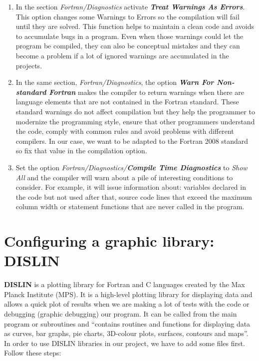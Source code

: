 \begin{enumerate}
    \item In the section \textit{Fortran/Diagnostics} activate \textbf{\textit{Treat Warnings As Errors}}. This option changes some Warnings to Errors so the compilation will fail until they are solved. This function helps to maintain a clean code and avoids to accumulate bugs in a program. Even when those warnings could let the program be compiled, they can also be conceptual mistakes and they can become a problem if a lot of ignored warnings are accumulated in the projects.
    
    \item In the same section, \textit{Fortran/Diagnostics}, the option \textbf{\textit{Warn For Non-standard Fortran}} makes the compiler to return warnings when there are language elements that are not contained in the Fortran standard. These standard warnings do not affect compilation but they help the programmer to modernize the programming style, ensure that other programmers understand the code, comply with common rules and avoid problems with different compilers. In our case, we want to be adapted to the Fortran 2008 standard so fix that value in the compilation option.
    
    \item Set the option \textit{Fortran/Diagnostics/\textbf{Compile Time Diagnostics}} to \textit{Show All} and the compiler will warn about a pile of interesting conditions to consider. For example, it will issue information about: variables declared in the code but not used after that, source code lines that exceed the maximum column width or statement functions that are never called in the program. 

\end{enumerate}




\newpage
\FloatBarrier
    \section{Configuring a graphic library: DISLIN}
    
\textbf{DISLIN} is a plotting library for Fortran and C languages created by the Max Planck Institute (MPS). It is a high-level plotting library for displaying data and allows a quick plot of results when we are making a lot of tests with the code or debugging (graphic debugging) our program. It can be called from the main program or subroutines and ``contains routines and functions for displaying data as curves, bar graphs, pie charts, 3D-colour plots, surfaces, contours and maps''. In order to use DISLIN libraries in our project, we have to add some files first. Follow these steps: 

